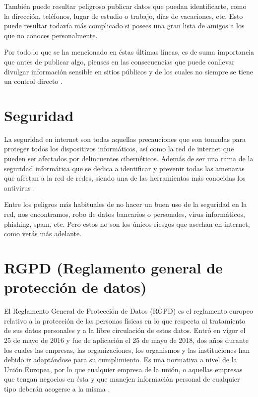 \documentclass[
  a4paper,
  openany]{book}
\begin{document}
También puede resultar peligroso publicar datos que puedan identificarte, como la dirección, teléfonos, lugar de estudio o trabajo, días de vacaciones, etc. Esto puede resultar todavía más complicado si posees una gran lista de amigos a los que no conoces personalmente.

Por todo lo que se ha mencionado en éstas últimas líneas, es de suma importancia que antes de publicar algo, pienses en las consecuencias que puede conllevar divulgar información sensible en sitios públicos y de los cuales no siempre se tiene un control directo \citep{privacidad}.

\hypertarget{seguridad}{%
\section{Seguridad}\label{seguridad}}

La seguridad en internet son todas aquellas precauciones que son tomadas para proteger todos los dispositivos informáticos, así como la red de internet que pueden ser afectados por delincuentes cibernéticos. Además de ser una rama de la seguridad informática que se dedica a identificar y prevenir todas las amenazas que afectan a la red de redes, siendo una de las herramientas más conocidas los antivirus \citep{seguridad}.

Entre los peligros más habituales de no hacer un buen uso de la seguridad en la red, nos encontramos, robo de datos bancarios o personales, virus informáticos, phishing, spam, etc. Pero estos no son los únicos riesgos que asechan en internet, como verás más adelante.

\hypertarget{rgpd-reglamento-general-de-protecciuxf3n-de-datos}{%
\section{RGPD (Reglamento general de protección de datos)}\label{rgpd-reglamento-general-de-protecciuxf3n-de-datos}}

El Reglamento General de Protección de Datos (RGPD) es el reglamento europeo relativo a la protección de las personas físicas en lo que respecta al tratamiento de sus datos personales y a la libre circulación de estos datos. Entró en vigor el 25 de mayo de 2016 y fue de aplicación el 25 de mayo de 2018, dos años durante los cuales las empresas, las organizaciones, los organismos y las instituciones han debido ir adaptándose para su cumplimiento. Es una normativa a nivel de la Unión Europea, por lo que cualquier empresa de la unión, o aquellas empresas que tengan negocios en ésta y que manejen información personal de cualquier tipo deberán acogerse a la misma \citep{WIKI-rgpd}.
\end{document}
